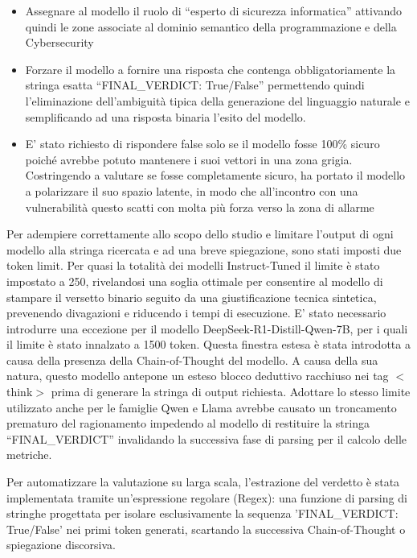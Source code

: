 \begin{itemize}
    \item Assegnare al modello il ruolo di “esperto di sicurezza informatica” attivando quindi le zone associate al dominio semantico della programmazione e della Cybersecurity
    \item Forzare il modello a fornire una risposta che contenga obbligatoriamente la stringa esatta “FINAL\_VERDICT: True/False” permettendo quindi l'eliminazione dell'ambiguità tipica della generazione del linguaggio naturale e semplificando ad una risposta binaria l'esito del modello.
    \item E' stato richiesto di rispondere false solo se il modello fosse 100\% sicuro poiché avrebbe potuto mantenere i suoi vettori in una zona grigia. Costringendo a valutare se fosse completamente sicuro, ha portato il modello a polarizzare il suo spazio latente, in modo che all'incontro con una vulnerabilità questo scatti con molta più forza verso la zona di allarme
\end{itemize}

Per adempiere correttamente allo scopo dello studio e limitare l'output di ogni modello alla stringa ricercata e ad una breve spiegazione, sono stati imposti due token limit.
Per quasi la totalità dei modelli Instruct-Tuned il limite è stato impostato a 250, rivelandosi una soglia ottimale per consentire al modello di stampare il versetto binario seguito da una giustificazione tecnica sintetica, prevenendo divagazioni e riducendo i tempi di esecuzione.
E' stato necessario introdurre una eccezione per il modello DeepSeek-R1-Distill-Qwen-7B, per i quali il limite è stato innalzato a 1500 token. Questa finestra estesa è stata introdotta a causa della presenza della Chain-of-Thought del modello. A causa della sua natura, questo modello antepone un esteso blocco deduttivo racchiuso nei tag $<$think$>$ prima di generare la stringa di output richiesta.
Adottare lo stesso limite utilizzato anche per le famiglie Qwen e Llama avrebbe causato un troncamento prematuro del ragionamento impedendo al modello di restituire la stringa “FINAL\_VERDICT” invalidando la successiva fase di parsing per il calcolo delle metriche.

Per automatizzare la valutazione su larga scala, l'estrazione del verdetto è stata implementata tramite un'espressione regolare (Regex): una funzione di parsing di stringhe progettata per isolare esclusivamente la sequenza 'FINAL\_VERDICT: True/False' nei primi token generati, scartando la successiva Chain-of-Thought o spiegazione discorsiva.


